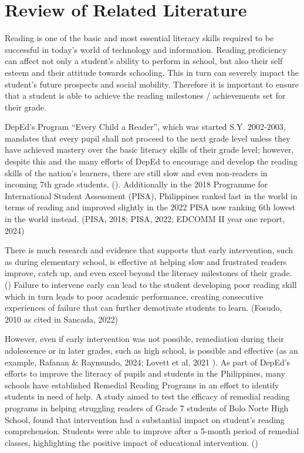 \chapter{Review of Related Literature}
\label{sec:relatedlit}

Reading is one of the basic and most essential literacy skills required to be successful in today’s world of technology and information. Reading proficiency can affect not only a student’s ability to perform in school, but also their self esteem and their attitude towards schooling. This in turn can severely impact the student’s future prospects and social mobility. Therefore it is important to ensure that a student is able to achieve the reading milestones / achievements set for their grade. 

DepEd’s Program “Every Child a Reader”, which was started S.Y. 2002-2003, mandates that every pupil shall not proceed to the next grade level unless they have achieved mastery over the basic literacy skills of their grade level; however, despite this and the many efforts of DepEd to encourage and develop the reading skills of the nation’s learners, there are still slow and even non-readers in incoming 7th grade students. (\cite{Sancada_2022}). Additionally in the 2018 Programme for International Student Assessment (PISA), Philippines ranked last in the world in terms of reading and improved slightly in the 2022 PISA now ranking 6th lowest in the world instead. (PISA, 2018; PISA, 2022; EDCOMM II year one report, 2024\nocite{EDCOMM2_2024})

There is much research and evidence that supports that early intervention, such as during elementary school, is effective at helping slow and frustrated readers improve, catch up, and even excel beyond the literacy milestones of their grade. (\cite{Lee_Gable_Klassen_2012}) Failure to intervene early can lead to the student developing poor reading skill which in turn leads to poor academic performance, creating consecutive experiences of failure that can further demotivate students to learn. (Fosudo, 2010 as cited in Sancada, 2022)

However, even if early intervention was not possible, remediation during their adolescence or in later grades, such as high school, is possible and effective (as an example, Rafanan \& Raymundo, 2024; Lovett et al, 2021 \nocite{Rafanan_Raymundo_2024} \nocite{Lovett_Frijters_Steinbach_Sevcik_Morris_2021}). As part of DepEd’s efforts to improve the literacy of pupils and students in the Philippines, many schools have established Remedial Reading Programs in an effort to identify students in need of help. A study aimed to test the efficacy of remedial reading programs in helping struggling readers of Grade 7 students of Bolo Norte High School, found that intervention had a substantial impact on student’s reading comprehension. Students were able to improve after a 5-month period of remedial classes, highlighting the positive impact of educational intervention. (\cite{Abergos_Cruz_Lasala_Prado_Tapar_Cañeza_Ocampo_2024})

